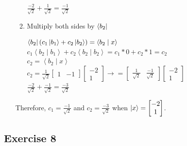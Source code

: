\documentclass[12pt]{article}
\theoremstyle{plain}
\theoremstyle{nonumberplain}
\theoremstyle{plain}
\theoremstyle{nonumberplain}
\newcommand\1{{\bf 1}}
\newcommand{\bmat}[1]{\begin{bmatrix*} #1 \end{bmatrix*}} %
\newcommand{\<}{\left\langle}
\renewcommand{\>}{\right\rangle}
\newcommand{\inp}[2]{\left\langle#1\mid #2\right\rangle} %
\begin{document}
\begin{enumerate}[label=(\alph*)]
\begin{enumerate}[label=(\roman*)]
\begin{center}
		$\frac{-2}{\sqrt{2}}+\frac{1}{\sqrt{2}}=\frac{-1}{\sqrt{2}}$ \\
		\end{center}
		\item Multiply both sides by $\bra{b_2}$
		\begin{center}
		$\bra{b_2}(c_1\ket{b_1}+c_2\ket{b_2})=\inp{b_2}{x}$ \\
		$c_1\inp{b_2}{b_1}+c_2\inp{b_2}{b_2} = c_1*0+c_2*1=c_2$ \\
		$c_2=\inp{b_2}{x}$ \\
		$c_2=\frac{1}{\sqrt{2}}\bmat{1 & -1}\bmat{-2 \\ 1}\longrightarrow =\bmat{\frac{1}{\sqrt{2}} & \frac{-1}{\sqrt{2}}}\bmat{-2 \\ 1}$ \\
		$\frac{-2}{\sqrt{2}}+\frac{-1}{\sqrt{2}}=\frac{-3}{\sqrt{2}}$ \\
		\end{center}
	\end{enumerate}
	Therefore, $c_1=\frac{-1}{\sqrt{2}}$ and $c_2=\frac{-3}{\sqrt{2}}$ when $\ket{x}=\bmat{-2 \\ 1}$.
\end{enumerate}


\subsection{Exercise 8}
\end{document}
